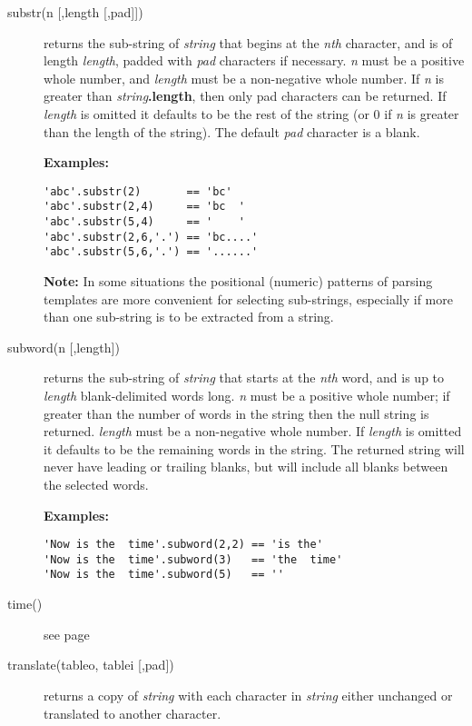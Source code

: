 \begin{description}
\item[substr(n [,length [,pad{]]})]\label{refsubstr}
returns the sub-string of \emph{string} that begins at the
\emph{n}\emph{th} character, and is of length \emph{length}, padded
with \emph{pad} characters if necessary.
\emph{n} must be a positive whole number, and \emph{length} must
be a non-negative whole number.
If \emph{n} is greater than \emph{string}\textbf{.length},
then only pad characters can be returned.
 If \emph{length} is omitted it defaults to be the rest of the
string (or 0 if \emph{n} is greater than the length of the string).
The default \emph{pad} character is a blank.
 
\textbf{Examples:}
\begin{lstlisting}
'abc'.substr(2)       == 'bc'
'abc'.substr(2,4)     == 'bc  '
'abc'.substr(5,4)     == '    '
'abc'.substr(2,6,'.') == 'bc....'
'abc'.substr(5,6,'.') == '......'
\end{lstlisting}
\textbf{Note: }In some situations the positional (numeric) patterns of parsing
templates are more convenient for selecting sub-strings, especially if
more than one sub-string is to be extracted from a string.

\item[subword(n [,length{]})]\label{refsubword}
returns the sub-string of \emph{string} that starts at the
\emph{n}\emph{th} word, and is up to \emph{length} blank-delimited
words long.
\emph{n} must be a positive whole number; if greater than the number
of words in the string then the null string is returned.
\emph{length} must be a non-negative whole number.
If \emph{length} is omitted it defaults to be the remaining words
in the string.
The returned string will never have leading or trailing blanks, but
will include all blanks between the selected words.
 
\textbf{Examples:}
\begin{lstlisting}
'Now is the  time'.subword(2,2) == 'is the'
'Now is the  time'.subword(3)   == 'the  time'
'Now is the  time'.subword(5)   == ''
\end{lstlisting}

\item[time()] see page \pageref{refrexxtime}
\index{,}
\item[translate(tableo, tablei [,pad{]})]\label{reftrans}
returns a copy of \emph{string} with each character in
\emph{string} either unchanged or translated to another character.
 

\end{description}
